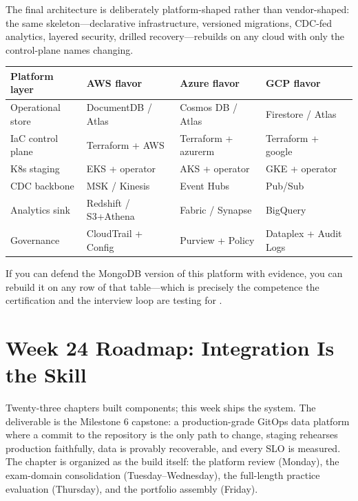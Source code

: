 \begin{crosscloud}
The final architecture is deliberately platform-shaped rather than vendor-shaped: the same skeleton---declarative infrastructure, versioned migrations, CDC-fed analytics, layered security, drilled recovery---rebuilds on any cloud with only the control-plane names changing.

\vspace{2mm}
{\footnotesize
\begin{tabular}{@{}p{2.9cm}p{3.0cm}p{3.0cm}p{3.0cm}@{}} 
\toprule
\textbf{Platform layer} & \textbf{AWS flavor} & \textbf{Azure flavor} & \textbf{GCP flavor} \\
\midrule
Operational store & DocumentDB / Atlas & Cosmos DB / Atlas & Firestore / Atlas \\
IaC control plane & Terraform + AWS & Terraform + azurerm & Terraform + google \\
K8s staging & EKS + operator & AKS + operator & GKE + operator \\
CDC backbone & MSK / Kinesis & Event Hubs & Pub/Sub \\
Analytics sink & Redshift / S3+Athena & Fabric / Synapse & BigQuery \\
Governance & CloudTrail + Config & Purview + Policy & Dataplex + Audit Logs \\
\bottomrule
\end{tabular}}

\vspace{1mm}
If you can defend the MongoDB version of this platform with evidence, you can rebuild it on any row of that table---which is precisely the competence the certification and the interview loop are testing for \cite{mongodbUniversityDocs,kleppmann2017ddia}.
\end{crosscloud}

\section{Week 24 Roadmap: Integration Is the Skill}
Twenty-three chapters built components; this week ships the system. The deliverable is the Milestone 6 capstone: a production-grade GitOps data platform where a commit to the repository is the only path to change, staging rehearses production faithfully, data is provably recoverable, and every SLO is measured. The chapter is organized as the build itself: the platform review (Monday), the exam-domain consolidation (Tuesday--Wednesday), the full-length practice evaluation (Thursday), and the portfolio assembly (Friday).

